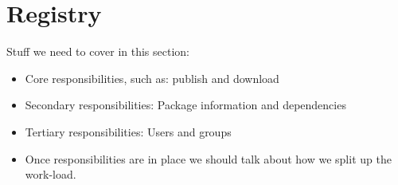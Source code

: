 
\section{Registry}
\label{sec:registry}

Stuff we need to cover in this section:

\begin{itemize}
\item Core responsibilities, such as: publish and download
\item Secondary responsibilities: Package information and dependencies
\item Tertiary responsibilities: Users and groups
\item Once responsibilities are in place we should talk about how we split up
the work-load.
\end{itemize}
